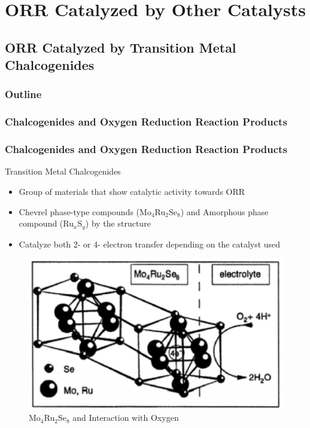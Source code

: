 \documentclass{beamer}
\begin{document}
\section{ORR Catalyzed by Other Catalysts}
\subsection{ORR Catalyzed by Transition Metal Chalcogenides}
\begin{frame}
\frametitle{Outline}
\tableofcontents[currentsection]
\end{frame}

\subsubsection{Chalcogenides and Oxygen Reduction Reaction Products}
\begin{frame}
\frametitle{Chalcogenides and Oxygen Reduction Reaction Products}

\begin{block}{Transition Metal Chalcogenides}
\begin{itemize}
\item{Group of materials that show catalytic activity towards ORR}
\item{\alert{Chevrel phase-type compounds} (Mo$_4$Ru$_2$Se$_8$) and \newline \alert{Amorphous phase compound} (Ru$_x$S$_y$) by the structure}
\item{Catalyze both 2- or 4- electron transfer depending on the catalyst used}
\end{itemize}
\end{block}

\begin{figure}[htbp]
    \begin{center}
    \includegraphics[scale=0.45]{image6}
    \caption{Mo$_4$Ru$_2$Se$_8$ and Interaction with Oxygen}
    \end{center}
\end{figure}
\end{frame}
\end{document}
